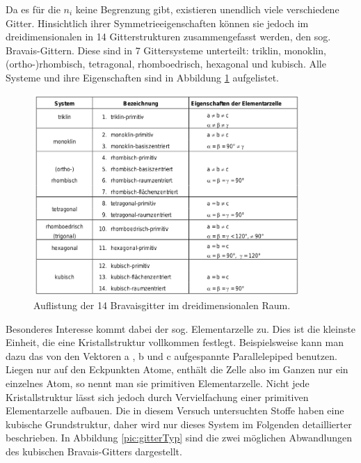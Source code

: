 Da es für die $n_i$ keine Begrenzung gibt, existieren unendlich viele verschiedene Gitter. Hinsichtlich ihrer Symmetrieeigenschaften können sie jedoch im dreidimensionalen in 14 Gitterstrukturen zusammengefasst werden, den sog. Bravais-Gittern. Diese sind in 7 Gittersysteme unterteilt: triklin, monoklin, (ortho-)rhombisch, tetragonal, rhomboedrisch, hexagonal und kubisch. Alle Systeme und ihre Eigenschaften sind in Abbildung \ref{pic:bravais} aufgelistet.
\begin{figure}[htbp]
	\includegraphics[width=0.9\textwidth]{../pics/bravais.png}
	\caption{Auflistung der 14 Bravaisgitter im dreidimensionalen Raum.}
	\label{pic:bravais}
\end{figure}
Besonderes Interesse  kommt dabei der sog. Elementarzelle zu. Dies ist die kleinste Einheit, die eine Kristallstruktur vollkommen festlegt. Beispielsweise kann man dazu das von den Vektoren a , b und c aufgespannte Parallelepiped benutzen. Liegen nur auf den Eckpunkten Atome, enthält die Zelle also im Ganzen nur ein einzelnes Atom, so nennt man sie primitiven Elementarzelle. 
Nicht jede Kristallstruktur lässt sich jedoch durch Vervielfachung einer primitiven Elementarzelle aufbauen. Die in diesem Versuch untersuchten Stoffe haben eine kubische Grundstruktur, daher wird nur dieses System im Folgenden detaillierter beschrieben. In Abbildung \ref{pic:gitterTyp} sind die zwei möglichen Abwandlungen des kubischen Bravais-Gitters dargestellt.
